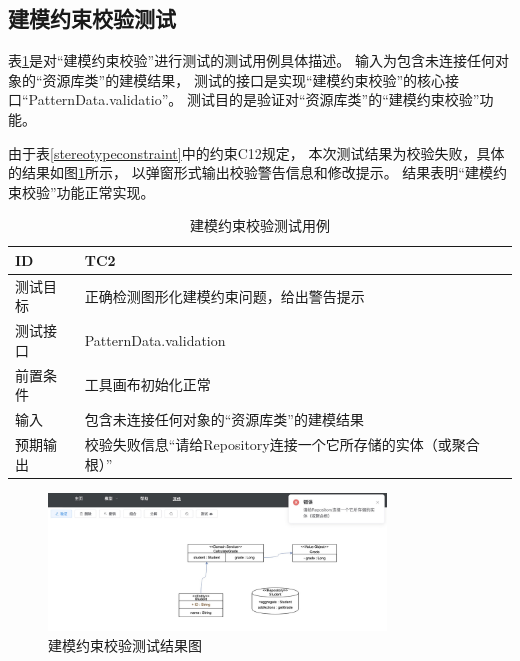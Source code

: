 \subsection{建模约束校验测试}

表\ref{testcase2}是对“建模约束校验”进行测试的测试用例具体描述。
输入为包含未连接任何对象的“资源库类”的建模结果，
测试的接口是实现“建模约束校验”的核心接口“PatternData.validatio”。
测试目的是验证对“资源库类”的“建模约束校验”功能。

由于表\ref{stereotypeconstraint}中的约束C12规定，
本次测试结果为校验失败，具体的结果如图\ref{Ftestcase2}所示，
以弹窗形式输出校验警告信息和修改提示。
结果表明“建模约束校验”功能正常实现。

{\footnotesize
\begin{longtable}[h]{m{80pt}|m{305pt}}
    \caption[建模约束校验测试用例]{建模约束校验测试用例} \label{testcase2} \\
        \hline  
        ID&TC2\\
        \hline
        测试目标&正确检测图形化建模约束问题，给出警告提示\\
        \hline
        测试接口&PatternData.validation\\
        \hline
        前置条件&工具画布初始化正常\\
        \hline
        输入& 包含未连接任何对象的“资源库类”的建模结果\\
        \hline
        预期输出& 校验失败信息“请给Repository连接一个它所存储的实体（或聚合根）”\\
        \hline  
\end{longtable} 

}
    \begin{figure}[h] %
        \centering %
        \includegraphics[width=0.8\textwidth]{FIGs/chapter5/Ftestcase2.jpg} %
        \caption{建模约束校验测试结果图} %
        \label{Ftestcase2} %
    \end{figure}%


